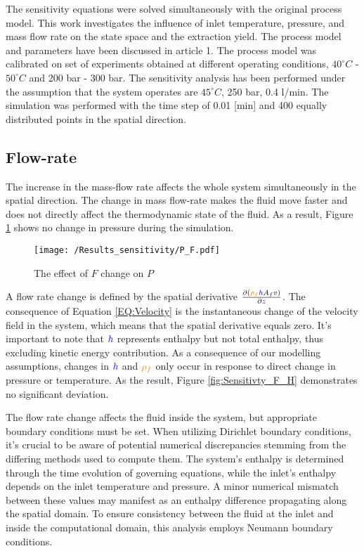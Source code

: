 \documentclass[../Article_Model_Parameters.tex]{subfiles}
\begin{document}
	
	\label{CH: Results}
	
	The sensitivity equations were solved simultaneously with the original process model. This work investigates the influence of inlet temperature, pressure, and mass flow rate on the state space and the extraction yield. The process model and parameters have been discussed in {\color{red}article 1}. The process model was calibrated on set of experiments obtained at different operating conditions, $40^\circ C$ - $50^\circ C$ and 200 bar - 300 bar. The sensitivity analysis has been performed under the assumption that the system operates are $45^\circ C$, 250 bar, 0.4 l/min. The simulation was performed with the time step of 0.01 [min] and 400 equally distributed points in the spatial direction.
	
	\subsection{Flow-rate}
	
	The increase in the mass-flow rate affects the whole system simultaneously in the spatial direction. The change in mass flow-rate makes the fluid move faster and does not directly affect the thermodynamic state of the fluid. As a result, Figure \ref{fig:Sensitivty_F_P} shows no change in pressure during the simulation. 
    
    \begin{figure}[h!]
    	\centering
    	\texttt{[image: /Results\_sensitivity/P\_F.pdf]}
    	\caption{The effect of $F$ change on $P$}
    	\label{fig:Sensitivty_F_P}
    \end{figure}
    
    A flow rate change is defined by the spatial derivative $\frac{\partial \left( {\color{orange}\rho_f}{\color{blue}h} A_f v \right)}{\partial {\color{blue}z}}$. The consequence of Equation \ref{EQ:Velocity} is the instantaneous change of the velocity field in the system, which means that the spatial derivative equals zero. It's important to note that ${\color{blue}h}$ represents enthalpy but not total enthalpy, thus excluding kinetic energy contribution. As a consequence of our modelling assumptions, changes in ${\color{blue}h}$ and ${\color{orange}\rho_f}$ only occur in response to direct change in pressure or temperature. As the result, Figure \ref{fig:Sensitivty_F_H} demonstrates no significant deviation.
    
    The flow rate change affects the fluid inside the system, but appropriate boundary conditions must be set. When utilizing Dirichlet boundary conditions, it's crucial to be aware of potential numerical discrepancies stemming from the differing methods used to compute them. The system's enthalpy is determined through the time evolution of governing equations, while the inlet's enthalpy depends on the inlet temperature and pressure. A minor numerical mismatch between these values may manifest as an enthalpy difference propagating along the spatial domain. To ensure consistency between the fluid at the inlet and inside the computational domain, this analysis employs Neumann boundary conditions.
        
\end{document}
